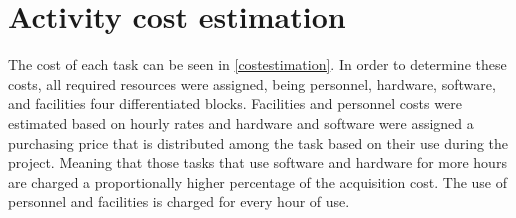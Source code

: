 \section{Activity cost estimation}
The cost of each task can be seen in \ref{costestimation}. In order to determine these costs, all required resources were assigned, being personnel, hardware, software, and facilities four differentiated blocks. Facilities and personnel costs were estimated based on hourly rates and hardware and software were assigned a purchasing price that is distributed among the task based on their use during the project. Meaning that those tasks that use software and hardware for more hours are charged a proportionally higher percentage of the acquisition cost. The use of personnel and facilities is charged for every hour of use.
